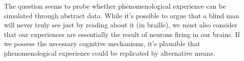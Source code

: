 The question seems to probe whether phenomenological experience can be simulated through abstract data. While it's possible to argue that a blind man will never truly see just by reading about it (in braille), we must also consider that our experiences are essentially the result of neurons firing in our brains. If we possess the necessary cognitive mechanisms, it's plausible that phenomenological experience could be replicated by alternative means.











































































































